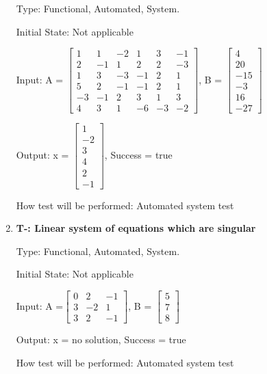 \documentclass[12pt, titlepage]{article}
\newcounter{tnum}
\begin{document}
\begin{enumerate}
Type: Functional, Automated, System.
					
Initial State: Not applicable
					
Input: A = $\begin{bmatrix} 
1 & 1 & -2 & 1 & 3 & -1 \\
2 & -1 & 1 & 2 & 2 & -3 \\
1 & 3 & -3 & -1 & 2 &1 \\
5 & 2 &-1 & -1 & 2 & 1 \\
-3 & -1 & 2 & 3 & 1 &3 \\
4 & 3 & 1 & -6 & -3 & -2
\end{bmatrix}$, B = $\begin{bmatrix} 
 4\\
20\\
-15\\
-3\\
16\\
-27 
\end{bmatrix}$
					
Output: x = $\begin{bmatrix} 
1\\
-2\\
3\\
4\\
2\\
-1 
\end{bmatrix}$, Success = true
					
How test will be performed: Automated system test

\item{\textbf{T-\thetnum \label{t-gauss-jordan_three}: Linear system of equations which are singular}}

Type: Functional, Automated, System.
					
Initial State: Not applicable
					
Input: A =$\begin{bmatrix} 
0 & 2 & -1 \\
3 & -2 & 1\\
3 & 2 & -1
\end{bmatrix}$, B = $\begin{bmatrix} 
5\\
7\\
8 
\end{bmatrix}$
					
Output: x = no solution, Success = true
					
How test will be performed: Automated system test

\end{enumerate}
\end{document}
